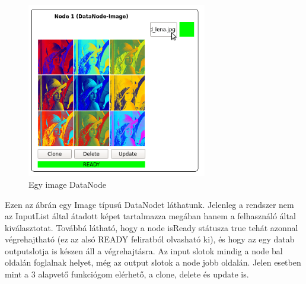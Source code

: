 \documentclass[a4paper,12pt,oneside]{report}
\begin{document}
\begin{center}
\begin{figure}[h]
  \includegraphics[width=0.7\textwidth]{node_editor.png}
  \caption{Egy image DataNode}

  \label{fig:bimg_node_editor}
\end{figure}
\end{center}

Ezen az ábrán egy Image típusú DataNodet láthatunk. Jelenleg a rendszer nem az InputList által átadott képet tartalmazza megában hanem a felhasználó által kiválasztotat. Továbbá látható, hogy a node isReady státusza true tehát azonnal végrehajtható (ez az alsó READY feliratból olvasható ki), és hogy az egy datab outputslotja is készen áll a végrehajtásra. Az input slotok mindig a node bal oldalán foglalnak helyet, még az output slotok a node jobb oldalán. Jelen esetben mint a 3 alapvető funkciógom elérhető, a clone, delete és update is.
\end{document}
